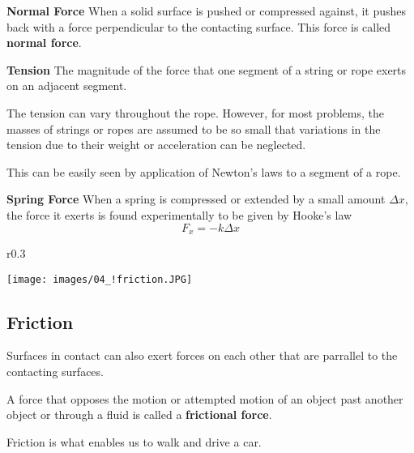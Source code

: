 \documentclass[11pt,a4paper]{report}
\begin{document}
\hspace{1mm}

\noindent
\textbf{Normal Force} When a solid surface is pushed or compressed against, it pushes back with a force perpendicular to the contacting surface. This force is called \textbf{normal force}.

\hspace{1mm}

\noindent
\textbf{Tension} The magnitude of the force that one segment of a string or rope exerts on an adjacent segment.


\hspace{1mm}

\noindent
The tension can vary throughout the rope. However, for most problems, the masses of strings or ropes are assumed to be so small that variations in the tension due to their weight or acceleration can be neglected.


\hspace{1mm}

\noindent
This can be easily seen by application of Newton's laws to a segment of a rope.

\hspace{1mm}

\noindent
\textbf{Spring Force} When a spring is compressed or extended by a small amount $\Delta{x}$, the force it exerts is found experimentally to be given by Hooke's law $$F_x = -k \Delta{x}$$

\begin{wrapfigure}{r}{0.3\textwidth}
\begin{center}
\texttt{[image: images/04\_!friction.JPG]}
\end{center}
\end{wrapfigure}

\subsection{Friction} Surfaces in contact can also exert forces on each other that are parrallel to the contacting surfaces.

\hspace{1mm}

\noindent
A force that opposes the motion or attempted motion of an object past another object or through a fluid is called a \textbf{frictional force}.

\hspace{1mm}

\noindent
Friction is what enables us to walk and drive a car.
\end{document}
